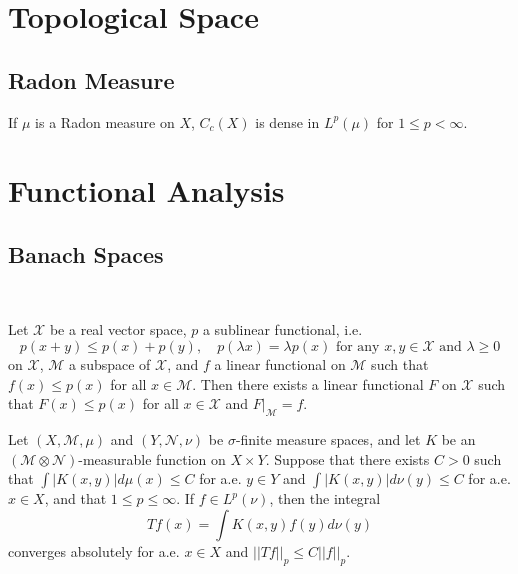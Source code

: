 \newcommand{\Schw}{\mathcal{S}}
\newcommand{\pnorm}[1]{\left\lVert{#1}\right\rVert}
\appendix

\section{Topological Space}

\subsection{Radon Measure}

\begin{proposition}
    If $\mu$ is a Radon measure on $X$, $C_c(X)$ is dense in $L^p(\mu)$ for $1\leq p < \infty$.
\end{proposition}

\section{Functional Analysis}

\subsection{Banach Spaces}

\begin{theorem}\ \par
    Let $\mathcal{X}$ be a real vector space, $p$ a sublinear functional, i.e.
    \[
    p(x+y) \leq p(x)+p(y),\quad p(\lambda x) = \lambda p(x)\text{ for any }x,y\in\mathcal{X}\text{ and }\lambda \geq 0
    \]
    on $\mathcal{X}$, $\mathcal{M}$ a subspace of $\mathcal{X}$, and $f$ a linear functional on $\mathcal{M}$ such that $f(x) \leq p(x)$ for all $x\in\mathcal{M}$. Then there exists a linear functional $F$ on $\mathcal{X}$ such that $F(x) \leq p(x)$ for all $x\in \mathcal{X}$ and $F|_{\mathcal{M}} = f$.
\end{theorem}

\begin{theorem}
    Let $(X,\mathcal{M},\mu)$ and $(Y,\mathcal{N},\nu)$ be $\sigma$-finite measure spaces, and let $K$ be an $(\mathcal{M}\otimes\mathcal{N})$-measurable function on $X\times Y$. Suppose that there exists $C>0$ such that $\int |K(x,y)|d\mu(x) \leq C$ for a.e. $y\in Y$ and $\int |K(x,y)|d\nu(y) \leq C$ for a.e. $x\in X$, and that $1\leq p \leq \infty$. If $f\in L^p(\nu)$, then the integral
    \[
    Tf(x) = \int K(x,y)f(y)d\nu(y)
    \]
    converges absolutely for a.e. $x\in X$ and $||Tf||_p \leq C||f||_p$.
\end{theorem}

